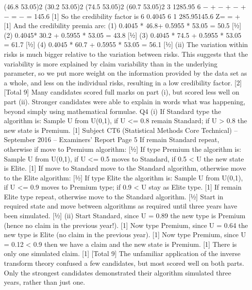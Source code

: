 \documentclass[]{report}
\begin{document}
  (46.8 53.05)2 (30.2 53.05)2 (74.5 53.05)2 (60.7 53.05)2
  3
  1285.95
  6
  − + − + − + −
  =
    −
  = 145.6 [1]
  So the credibility factor is 6 0.4045
  6 1 285.95145.6
  Z= =
    +
    [1]
  And the credibility premia are:
    (1) 0.4045 * 46.8+ 0.5955 * 53.05 = 50.5 [½]
  (2) 0.4045* 30.2 + 0.5955 * 53.05 = 43.8 [½]
  (3) 0.4045 * 74.5 + 0.5955 * 53.05 = 61.7 [½]
  (4) 0.4045 * 60.7 + 0.5955 * 53.05 = 56.1 [½]
  (ii) The variation within risks is much bigger relative to the variation between
  risks. This suggests that the variability is more explained by claim variability
  than in the underlying parameter, so we put more weight on the information
  provided by the data set as a whole, and less on the individual risks, resulting
  in a low credibility factor. [2]
  [Total 9]
  Many candidates scored full marks on part (i), but scored less well on part (ii).
  Stronger candidates were able to explain in words what was happening,
  beyond simply using mathematical formulae.
  Q4 (i) If Standard type the algorithm is:
    Sample U from U(0,1), if U <= 0.8 remain Standard; if U > 0.8 the new state
  is Premium. [1]
  Subject CT6 (Statistical Methods Core Technical) – September 2016 – Examiners’ Report
  Page 5
  If remain Standard repeat, otherwise if move to Premium algorithm: [½]
  If type Premium the algorithm is:
    Sample U from U(0,1), if U <= 0.5 moves to Standard, if 0.5 < U the new state
  is Elite. [1]
  If move to Standard move to the Standard algorithm, otherwise move to the
  Elite algorithm: [½]
  If type Elite the algorithm is:
    Sample U from U(0,1), if U <= 0.9 moves to Premium type; if 0.9 < U stay as
  Elite type. [1]
  If remain Elite type repeat, otherwise move to the Standard algorithm. [½]
  Start in required state and move between algorithms as required until three
  years have been simulated. [½]
  (ii) Start Standard, since U = 0.89 the new type is Premium (hence no claim in the
                                                               previous year!). [1]
  Now type Premium, since U = 0.64 the new type is Elite (no claim in the
                                                          previous year). [1]
  Now type Premium, since U = 0.12 < 0.9 then we have a claim and the new
  state is Premium. [1]
  There is only one simulated claim. [1]
  [Total 9]
  The unfamiliar application of the inverse transform theory confused a few
  candidates, but most scored well on both parts. Only the strongest
  candidates demonstrated their algorithm simulated three years, rather than
  just one.
  
\end{document}
